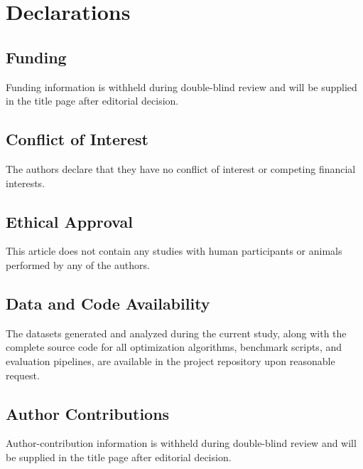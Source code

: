 
\section*{Declarations}

\subsection*{Funding}
Funding information is withheld during double-blind review and will be supplied in the title page after editorial decision.

\subsection*{Conflict of Interest}
The authors declare that they have no conflict of interest or competing financial interests.

\subsection*{Ethical Approval}
This article does not contain any studies with human participants or animals performed by any of the authors.

\subsection*{Data and Code Availability}
The datasets generated and analyzed during the current study, along with the complete source code for all optimization algorithms, benchmark scripts, and evaluation pipelines, are available in the project repository upon reasonable request.

\subsection*{Author Contributions}
Author-contribution information is withheld during double-blind review and will be supplied in the title page after editorial decision.
